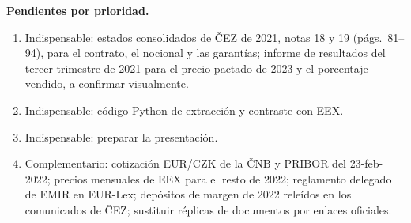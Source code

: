 \documentclass[11pt,letterpaper]{article}
\theoremstyle{plain}
\theoremstyle{definition}
\theoremstyle{remark}
\numberwithin{equation}{section}
\begin{document}
\textbf{Pendientes por prioridad.} 
\begin{enumerate}
    \item Indispensable: estados consolidados de ČEZ de 2021, notas 18 y 19 (págs.~81--94), para el contrato, el nocional y las garantías; informe de resultados del tercer trimestre de 2021 para el precio pactado de 2023 y el porcentaje vendido, a confirmar visualmente. 
    \item Indispensable: código Python de extracción y contraste con EEX. 
    \item Indispensable: preparar la presentación. 
    \item Complementario: cotización EUR/CZK de la ČNB y PRIBOR del 23-feb-2022; precios mensuales de EEX para el resto de 2022; reglamento delegado de EMIR en EUR-Lex; depósitos de margen de 2022 releídos en los comunicados de ČEZ; sustituir réplicas de documentos por enlaces oficiales.
\end{enumerate}

\clearpage
  \printbibliography[title={Referencias bibliográficas}]

\clearpage
\appendix
\renewcommand{\thesection}{\Alph{section}}
\end{document}
